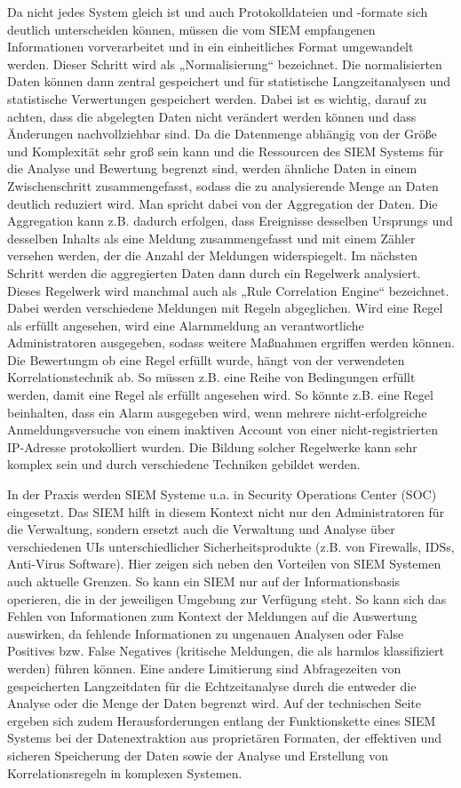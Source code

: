 Da nicht jedes System gleich ist und auch Protokolldateien und -formate sich deutlich unterscheiden können, müssen die vom SIEM empfangenen Informationen vorverarbeitet und in ein einheitliches Format umgewandelt werden. Dieser Schritt wird als „Normalisierung“ bezeichnet. Die normalisierten Daten können dann zentral gespeichert und für statistische Langzeitanalysen und statistische Verwertungen gespeichert werden. 
Dabei ist es wichtig, darauf zu achten, dass die abgelegten Daten nicht verändert werden können und dass Änderungen nachvollziehbar sind. Da die Datenmenge abhängig von der Größe und Komplexität sehr groß sein kann und die Ressourcen des SIEM Systems für die Analyse und Bewertung begrenzt sind, werden ähnliche Daten in einem Zwischenschritt zusammengefasst, sodass die zu analysierende Menge an Daten deutlich reduziert wird. Man spricht dabei von der Aggregation der Daten. Die Aggregation kann z.B. dadurch erfolgen, dass Ereignisse desselben Ursprungs und desselben Inhalts als eine Meldung zusammengefasst und mit einem Zähler versehen werden, der die Anzahl der Meldungen widerspiegelt.
Im nächsten Schritt werden die aggregierten Daten dann durch ein Regelwerk analysiert. Dieses Regelwerk wird manchmal auch als „Rule Correlation Engine“ bezeichnet. Dabei werden verschiedene Meldungen mit Regeln abgeglichen. Wird eine Regel als erfüllt angesehen, wird eine Alarmmeldung an verantwortliche Administratoren ausgegeben, sodass weitere Maßnahmen ergriffen werden können.  Die Bewertungm ob eine Regel erfüllt wurde, hängt von der verwendeten Korrelationstechnik ab. So müssen z.B. eine Reihe von Bedingungen erfüllt werden, damit eine Regel als erfüllt angesehen wird. So könnte z.B. eine Regel beinhalten, dass ein Alarm ausgegeben wird, wenn mehrere nicht-erfolgreiche Anmeldungsversuche von einem inaktiven Account von einer nicht-registrierten IP-Adresse protokolliert wurden. Die Bildung solcher Regelwerke kann sehr komplex sein und durch verschiedene Techniken gebildet werden.


In der Praxis werden SIEM Systeme u.a. in Security Operations Center (SOC) eingesetzt. Das SIEM hilft in diesem Kontext nicht nur den Administratoren für die Verwaltung, sondern ersetzt auch die Verwaltung und Analyse über verschiedenen UIs unterschiedlicher Sicherheitsprodukte (z.B. von Firewalls, IDSs, Anti-Virus Software). 
Hier zeigen sich neben den Vorteilen von SIEM Systemen auch aktuelle Grenzen. So kann ein SIEM nur auf der Informationsbasis operieren, die in der jeweiligen Umgebung zur Verfügung steht. So kann sich das Fehlen von Informationen zum Kontext der Meldungen auf die Auswertung auswirken, da fehlende Informationen zu ungenauen Analysen oder False Positives bzw. False Negatives (kritische Meldungen, die als harmlos klassifiziert werden) führen können. Eine andere Limitierung sind Abfragezeiten von gespeicherten Langzeitdaten für die Echtzeitanalyse durch die entweder die Analyse oder die Menge der Daten begrenzt wird. Auf der technischen Seite ergeben sich zudem Herausforderungen entlang der Funktionskette eines SIEM Systems bei der Datenextraktion aus proprietären Formaten, der effektiven und sicheren Speicherung der Daten sowie der Analyse und Erstellung von Korrelationsregeln in komplexen Systemen. 


